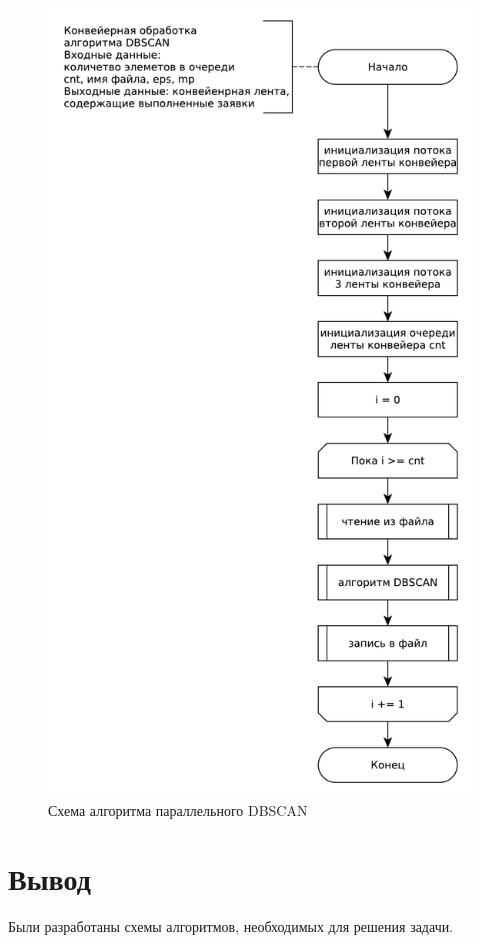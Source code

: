 \begin{figure}[ht!]
	\centering
	\includegraphics[width=0.7\linewidth]{assets/graphs/pipeline.pdf}
	\caption{Схема алгоритма параллельного DBSCAN}
	\label{fig:alg-p}
\end{figure}


\section*{Вывод}

Были разработаны схемы алгоритмов, необходимых для решения задачи.
